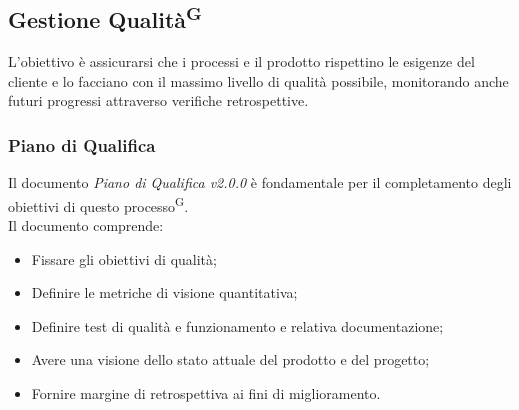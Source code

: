 \documentclass[8pt]{article}
\newcommand{\glossterm}[1]{#1\textsuperscript{G}} %
\begin{document}
\subsection{Gestione \glossterm{Qualità}}
L'obiettivo è assicurarsi che i processi e il prodotto rispettino le esigenze del cliente e lo facciano con il massimo livello di qualità possibile, monitorando anche futuri progressi attraverso verifiche retrospettive.

\subsubsection{Piano di Qualifica}
Il documento \textit{Piano di Qualifica v2.0.0} è fondamentale per il completamento degli obiettivi di questo \glossterm{processo}. 
\\Il documento comprende:
\begin{itemize}
    \item Fissare gli obiettivi di qualità;
    \item Definire le metriche di visione quantitativa;
    \item Definire test di qualità e funzionamento e relativa documentazione;
    \item Avere una visione dello stato attuale del prodotto e del progetto;
    \item Fornire margine di retrospettiva ai fini di miglioramento.
\end{itemize}
\end{document}
